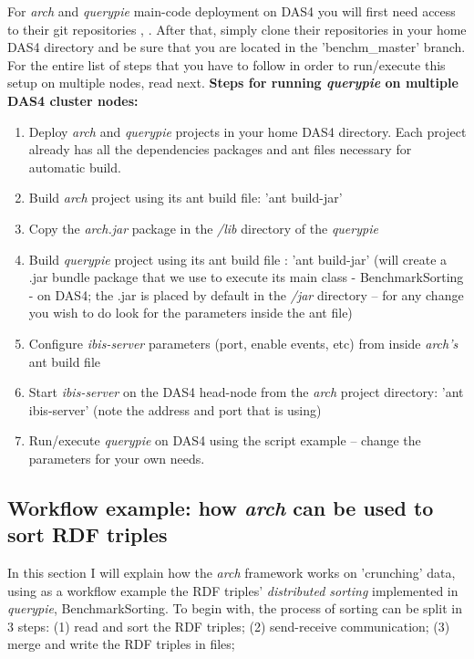 For \textit{arch} and \textit{querypie} main-code deployment on DAS4 you will first need access to their git repositories \cite{arch_repo}, \cite{qpie_repo}. After that, simply clone their repositories in your home DAS4 directory and be sure that you are located in the 'benchm_master' branch. For the entire list of steps that you have to follow in order to run/execute this setup on multiple nodes, read next.
\newline
\newline
\textbf{Steps for running \textit{querypie} on multiple DAS4 cluster nodes:}
\begin{enumerate}
	\item Deploy \textit{arch} and \textit{querypie} projects in your home DAS4 directory. Each project already has all the dependencies packages and ant files necessary for automatic build. 
	\item Build \textit{arch} project using its ant build file: 'ant build-jar' 
	\item Copy the \textit{arch.jar} package in the \textit{/lib} directory of the \textit{querypie}
	\item Build \textit{querypie} project using its ant build file \cite{build_file}: 'ant build-jar' (will create a .jar bundle package that we use to execute its main class - BenchmarkSorting - on DAS4; the .jar is placed by default in the \textit{/jar} directory -- for any change you wish to do look for the parameters inside the ant file)
	\item Configure \textit{ibis-server} parameters (port, enable events, etc) from inside \textit{arch's} ant build file 
	\item Start \textit{ibis-server} on the DAS4 head-node from the \textit{arch} project directory: 'ant ibis-server' (note the address and port that is using)
	\item Run/execute \textit{querypie} on DAS4 using the script example \cite{run_on_das4} -- change the parameters for your own needs.
\end{enumerate}

% 
\subsection{Workflow example: how \textit{arch} can be used to sort RDF triples}

In this section I will explain how the \textit{arch} framework works on 'crunching' data, using as a workflow example the RDF triples' \textit{distributed sorting} implemented in \textit{querypie}, BenchmarkSorting. To begin with, the process of sorting can be split in 3 steps: (1) read and sort the RDF triples; (2) send-receive communication; (3) merge and write the RDF triples in files;

